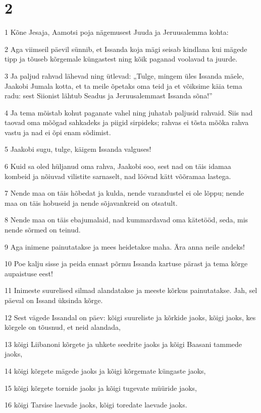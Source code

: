 \chapter{2}

\par 1 Kõne Jesaja, Aamotsi poja nägemusest Juuda ja Jeruusalemma kohta:
\par 2 Aga viimseil päevil sünnib, et Issanda koja mägi seisab kindlana kui mägede tipp ja tõuseb kõrgemale küngastest ning kõik paganad voolavad ta juurde.
\par 3 Ja paljud rahvad lähevad ning ütlevad: „Tulge, mingem üles Issanda mäele, Jaakobi Jumala kotta, et ta meile õpetaks oma teid ja et võiksime käia tema radu: sest Siionist lähtub Seadus ja Jeruusalemmast Issanda sõna!”
\par 4 Ja tema mõistab kohut paganate vahel ning juhatab paljusid rahvaid. Siis nad taovad oma mõõgad sahkadeks ja piigid sirpideks; rahvas ei tõsta mõõka rahva vastu ja nad ei õpi enam sõdimist.
\par 5 Jaakobi sugu, tulge, käigem Issanda valguses!
\par 6 Kuid sa oled hüljanud oma rahva, Jaakobi soo, sest nad on täis idamaa kombeid ja nõiuvad vilistite sarnaselt, nad löövad kätt võõramaa lastega.
\par 7 Nende maa on täis hõbedat ja kulda, nende varandustel ei ole lõppu; nende maa on täis hobuseid ja nende sõjavankreid on otsatult.
\par 8 Nende maa on täis ebajumalaid, nad kummardavad oma kätetööd, seda, mis nende sõrmed on teinud.
\par 9 Aga inimene painutatakse ja mees heidetakse maha. Ära anna neile andeks!
\par 10 Poe kalju sisse ja peida ennast põrmu Issanda kartuse pärast ja tema kõrge aupaistuse eest!
\par 11 Inimeste suurelised silmad alandatakse ja meeste kõrkus painutatakse. Jah, sel päeval on Issand üksinda kõrge.
\par 12 Sest vägede Issandal on päev: kõigi suureliste ja kõrkide jaoks, kõigi jaoks, kes kõrgele on tõusnud, et neid alandada,
\par 13 kõigi Liibanoni kõrgete ja uhkete seedrite jaoks ja kõigi Baasani tammede jaoks,
\par 14 kõigi kõrgete mägede jaoks ja kõigi kõrgemate küngaste jaoks,
\par 15 kõigi kõrgete tornide jaoks ja kõigi tugevate müüride jaoks,
\par 16 kõigi Tarsise laevade jaoks, kõigi toredate laevade jaoks.
